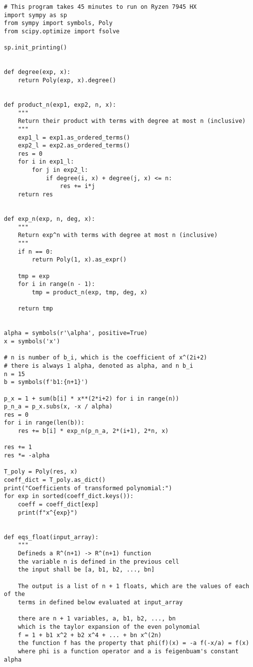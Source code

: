 \begin{lstlisting}[style=python]
# This program takes 45 minutes to run on Ryzen 7945 HX
import sympy as sp
from sympy import symbols, Poly
from scipy.optimize import fsolve

sp.init_printing()


def degree(exp, x):
    return Poly(exp, x).degree()


def product_n(exp1, exp2, n, x):
    """
    Return their product with terms with degree at most n (inclusive)
    """
    exp1_l = exp1.as_ordered_terms()
    exp2_l = exp2.as_ordered_terms()
    res = 0
    for i in exp1_l:
        for j in exp2_l:
            if degree(i, x) + degree(j, x) <= n:
                res += i*j
    return res


def exp_n(exp, n, deg, x):
    """
    Return exp^n with terms with degree at most n (inclusive)
    """
    if n == 0:
        return Poly(1, x).as_expr()

    tmp = exp
    for i in range(n - 1):
        tmp = product_n(exp, tmp, deg, x)

    return tmp


alpha = symbols(r'\alpha', positive=True)
x = symbols('x')

# n is number of b_i, which is the coefficient of x^(2i+2)
# there is always 1 alpha, denoted as alpha, and n b_i
n = 15
b = symbols(f'b1:{n+1}')

p_x = 1 + sum(b[i] * x**(2*i+2) for i in range(n))
p_n_a = p_x.subs(x, -x / alpha)
res = 0
for i in range(len(b)):
    res += b[i] * exp_n(p_n_a, 2*(i+1), 2*n, x)

res += 1
res *= -alpha

T_poly = Poly(res, x)
coeff_dict = T_poly.as_dict()
print("Coefficients of transformed polynomial:")
for exp in sorted(coeff_dict.keys()):
    coeff = coeff_dict[exp]
    print(f"x^{exp}")


def eqs_float(input_array):
    """
    Defineds a R^(n+1) -> R^(n+1) function
    the variable n is defined in the previous cell
    the input shall be [a, b1, b2, ..., bn]

    The output is a list of n + 1 floats, which are the values of each of the
    terms in defined below evaluated at input_array

    there are n + 1 variables, a, b1, b2, ..., bn
    which is the taylor expansion of the even polynomial
    f = 1 + b1 x^2 + b2 x^4 + ... + bn x^(2n)
    the function f has the property that phi(f)(x) = -a f(-x/a) = f(x)
    where phi is a function operator and a is feigenbuam's constant alpha


\end{lstlisting}
